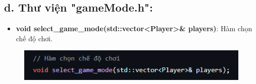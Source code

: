 \documentclass{article}
\begin{document}
\newpage
\subsection{d. Thư viện "gameMode.h": }
\begin{itemize}
    \item \textbf{void select\_game\_mode(std::vector<Player>\& players)}: Hàm chọn chế độ chơi.
\end{itemize}
    \begin{figure}[h!]
        \centering 
        \includegraphics[width=1\textwidth]{images/screenshot/select_game_mode.png}
    \end{figure}
\end{document}
